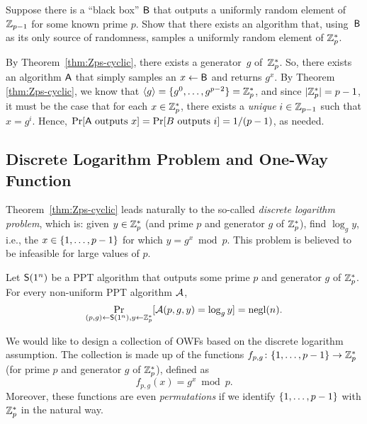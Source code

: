 \documentclass[11pt]{article}
\begin{document}
\begin{question}
  Suppose there is a ``black box'' \(\mathsf{B}\) that outputs a
  uniformly random element of \(\mathbb{Z}_{p-1}\) for some known prime
  \(p\). Show that there exists an algorithm that, using~\(\mathsf{B}\)
  as its only source of randomness, samples a uniformly random element
  of \(\mathbb{Z}_p^*\).
\end{question}

\begin{answer}
  By Theorem~\ref{thm:Zps-cyclic}, there exists a generator~\(g\)
  of~\(\mathbb{Z}_p^{*}\). So, there exists an algorithm \(\mathsf{A}\) that
  simply samples an $x \gets \mathsf{B}$ and returns \(g^{x}\). By
  Theorem \ref{thm:Zps-cyclic}, we know that
  \(\langle g\rangle = \{g^0, \ldots, g^{p-2}\} = \mathbb{Z}_p^*\), and since
  \(\lvert\mathbb{Z}_p^*\rvert = p - 1\), it must be the case that for each
  \(x \in \mathbb{Z}_p^*\), there exists a \emph{unique} \(i \in \mathbb{Z}_{p-1}\)
  such that \(x = g^i\). Hence,
  \(\Pr[\mathsf{A} \text{ outputs } x] = \Pr[B \text{ outputs } i] =
  1/(p-1)\), as needed.
\end{answer}

\subsection{Discrete Logarithm Problem and One-Way Function}
\label{sec:dlp-owf}

Theorem~\ref{thm:Zps-cyclic} leads naturally to the so-called
\emph{discrete logarithm problem}, which is: given $y \in \mathbb{Z}_p^{*}$
(and prime $p$ and generator $g$ of $\mathbb{Z}_p^{*}$), find $\log_{g} y$,
i.e., the $x \in \{1, \ldots, p-1\}$ for which $y = g^{x} \bmod p$.
This problem is believed to be infeasible for large values of $p$.

\begin{conjecture}
  Let $\mathsf{S}(1^{n})$ be a PPT algorithm that outputs some prime $p$
  and generator $g$ of $\mathbb{Z}_p^{*}$.  For every non-uniform PPT algorithm
  $\mathcal{A}$, \[ \Pr_{(p,g) \gets \mathsf{S}(1^{n}), y \gets \mathbb{Z}_p^{*}}
  [\mathcal{A}(p,g,y) = \log_{g} y] = \operatorname{negl}(n). \]
\end{conjecture}

We would like to design a collection of OWFs based on the discrete
logarithm assumption.  The collection is made up of the functions
$f_{p,g} \colon \{1, \ldots, p-1\} \to \mathbb{Z}_p^{*}$ (for prime $p$ and
generator $g$ of $\mathbb{Z}_p^{*}$), defined as
\[ f_{p,g}(x) = g^{x} \bmod p. \] Moreover, these functions are even
\emph{permutations} if we identify $\{1, \ldots, p-1\}$ with
$\mathbb{Z}_p^{*}$ in the natural way.
\end{document}
